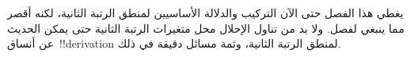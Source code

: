 \documentclass[../../../include/open-logic-chapter]{subfiles}
\begin{document}

\begin{editorial}
يغطي هذا الفصل حتى الآن التركيب والدلالة الأساسيين لمنطق الرتبة
الثانية، لكنه أقصر مما ينبغي لفصل. ولا بد من تناول الإحلال محل متغيرات
الرتبة الثانية حتى يمكن الحديث عن أنساق~!!{derivation} لمنطق الرتبة
الثانية، وثمة مسائل دقيقة في ذلك.
\end{editorial}







\OLEndChapterHook
\end{document}
